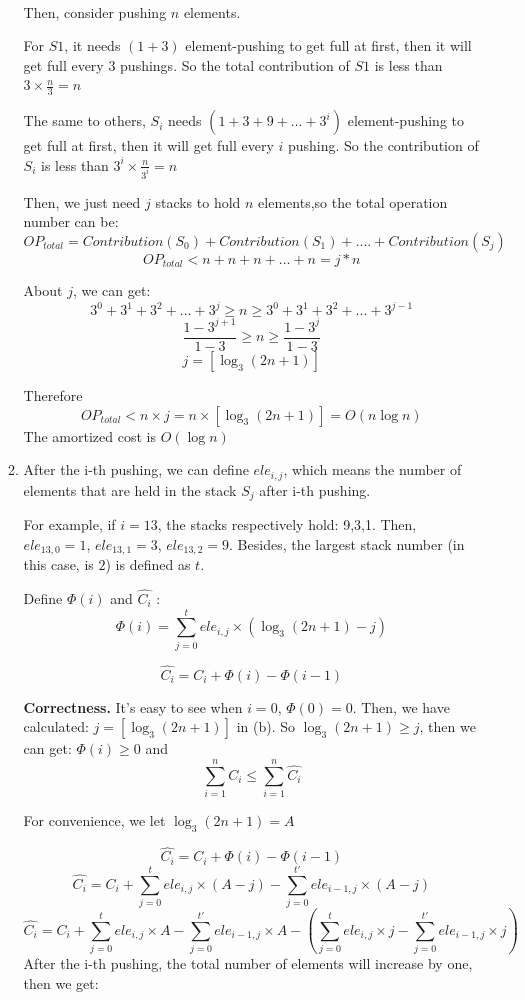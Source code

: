 \documentclass[12pt,a4paper]{article}
\theoremstyle{definition}
\begin{document}
\begin{enumerate}
\begin{enumerate}
		~\\
		Then, consider pushing $ n$ elements.
		
		For $S1$, it needs $(1+3)$ element-pushing to get full at first, then it will get full every 3 pushings. So the total contribution of $S1$ is less than $3\times \frac{n}{3}=n$
		
		
		The same to others, $S_i$ needs $(1+3+9+...+3^i)$ element-pushing to get full at first, then it will get full every $i$ pushing.  So the contribution of $S_i$ is less than $3^i\times \frac{n}{3^i}=n$
		
		Then,  we just need $j$ stacks to hold $n$ elements,so the total operation number can be:
		$$OP_{total}=Contribution(S_0)+Contribution(S_1)+....+Contribution(S_j)$$
		$$OP_{total}<n+n+n+...+n=j*n$$
		
		About $j$, we can get:
		$$3^0+3^1+3^2+...+3^j \geq n \geq 3^0+3^1+3^2+...+3^{j-1}$$
		$$\frac{1-3^{j+1}}{1-3} \geq n \geq \frac{1-3^j}{1-3}$$
		$$j =[ \log_{3} {(2n+1)}]$$
		
		Therefore$$OP_{total}<n\times j =n\times [ \log_{3} {(2n+1)}]=O(n\log n)$$ The amortized cost is $O(\log n)$
		
		
		\item After the i-th pushing, we can define $ele_{i,j}$, which means the number  of elements that are held in the stack $S_j$ after i-th pushing.
		
		For example, if $i=13$, the stacks respectively hold: 9,3,1. Then, $ele_{13,0}=1$, $ele_{13,1}=3$, $ele_{13,2}=9$. Besides, the largest stack number (in this case, is $2$) is defined as $t$.
				
		Define $\Phi(i)$ and $\widehat{C_i}$ :		
		$$\Phi(i)=\sum_{j=0}^{t}ele_{i,j}\times(\log_3 (2n+1)-j  )$$
		
		
		$$\widehat{C_i}=C_i+\Phi(i)-\Phi(i-1) $$	
		
		\textbf{Correctness.} It's easy to see when $i=0$, $\Phi(0)=0$.
		Then, we have calculated: $j =[ \log_{3} {(2n+1)}]$ in (b).
		So $\log_{3} {(2n+1)}\geq j$, then we can get: $\Phi(i)\geq 0$ and $$\sum_{i=1}^{n}{C_i}\leq  \sum_{i=1}^{n}\widehat{C_i}$$
		
	
		
		For convenience, we let $\log_3 (2n+1)=A$
		
		
			$$\widehat{C_i}=C_i+\Phi(i)-\Phi(i-1) $$
			$$\widehat{C_i}=C_i+\sum_{j=0}^{t}ele_{i,j}\times(A-j)-\sum_{j=0}^{t'}ele_{i-1,j}\times(A-j)$$
		$$\widehat{C_i}=C_i+\sum_{j=0}^{t}ele_{i,j}\times A-\sum_{j=0}^{t'}ele_{i-1,j}\times A - (\sum_{j=0}^{t}ele_{i,j}\times j-\sum_{j=0}^{t'}ele_{i-1,j}\times j )$$
		After the i-th pushing, the total number of elements will increase by one, then  we get:
		

\end{enumerate}
\end{enumerate}
\end{document}
